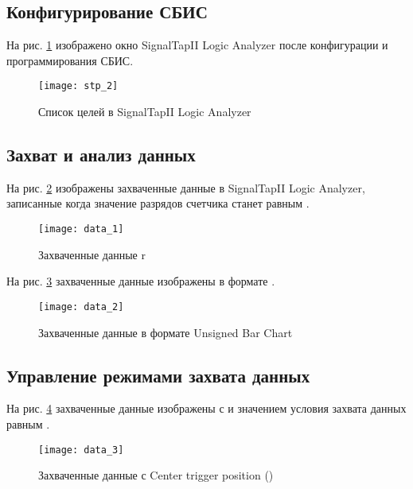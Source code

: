 \subsection{Конфигурирование СБИС}

На рис. \ref{fig:stp_2} изображено окно SignalTapII Logic Analyzer после конфигурации и программирования СБИС.

\begin{figure}[H]
	\begin{center}
		\texttt{[image: stp\_2]}
		\caption{Список целей в SignalTapII Logic Analyzer}
		\label{fig:stp_2}
	\end{center}
\end{figure}

\subsection{Захват и анализ данных}

На рис. \ref{fig:data_1} изображены захваченные данные в SignalTapII Logic Analyzer, записанные когда значение разрядов счетчика  станет равным .

\begin{figure}[H]
	\begin{center}
		\texttt{[image: data\_1]}
		\caption{Захваченные данные r}
		\label{fig:data_1}
	\end{center}
\end{figure}

На рис. \ref{fig:data_2} захваченные данные изображены в формате .

\begin{figure}[H]
	\begin{center}
		\texttt{[image: data\_2]}
		\caption{Захваченные данные в формате Unsigned Bar Chart}
		\label{fig:data_2}
	\end{center}
\end{figure}

\subsection{Управление режимами захвата данных}

На рис. \ref{fig:data_3} захваченные данные изображены с  и значением условия захвата данных равным .

\vspace{-0.5cm}
\begin{figure}[H]
	\begin{center}
		\texttt{[image: data\_3]}
		\caption{Захваченные данные с Center trigger position ()}
		\label{fig:data_3}
	\end{center}
\end{figure}

